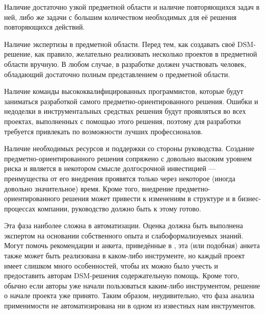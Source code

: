 Наличие достаточно узкой предметной области и наличие повторяющихся задач в ней, 
либо же задачи с большим количеством необходимых для её решения повторяющихся действий.

Наличие экспертизы в предметной области.  Перед тем, как создавать своё DSM-решение, 
как правило, желательно реализовать несколько проектов в предметной области вручную. 
В любом случае, в разработке должен участвовать человек, обладающий достаточно полным 
представлением о предметной области.

Наличие команды высококвалифицированных программистов, которые будут заниматься разработкой 
самого предметно-ориентированного решения. Ошибки и недоделки в инструментальных средствах 
решения будут проявляться во всех проектах, выполненных с помощью этого решения, поэтому 
для разработки требуется привлекать по возможности лучших профессионалов.

Наличие необходимых ресурсов и поддержки со стороны руководства. Создание предметно-ориентированного 
решения сопряжено с довольно высоким уровнем риска и является в некотором смысле долгосрочной 
инвестицией --- преимущества от его внедрения проявятся только через некоторое (иногда 
довольно значительное) время. Кроме того, внедрение предметно-ориентированного решения 
может привести к изменениям в структуре и в бизнес-процессах компании, руководство 
должно быть к этому готово.

Эта фаза наиболее сложна в автоматизации. Оценка должна быть выполнена экспертом на 
основании собственного опыта и слабоформализуемых знаний. Могут помочь рекомендации 
и анкета, приведённые в \cite{kelly2008domain}, эта (или подобная) анкета также может 
быть реализована в каком-либо инструменте, но каждый проект имеет слишком много особенностей, 
чтобы их можно было учесть и предоставить авторам DSM-решения содержательную помощь. 
Кроме того, обычно если авторы уже начали пользоваться каким-либо инструментом, решение 
о начале проекта уже принято. Таким образом, неудивительно, что фаза анализа применимости 
не автоматизирована ни в одном из известных нам инструментов.

